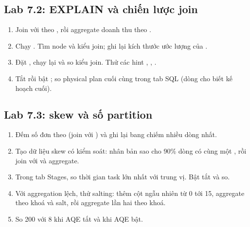 \subsection{Lab 7.2: EXPLAIN và chiến lược join}
\begin{enumerate}
  \item Join  với  theo , rồi aggregate doanh thu theo .
  \item Chạy . Tìm node  và kiểu join; ghi lại kích thước ước lượng của .
  \item Đặt , chạy lại và so kiểu join. Thử các hint , , .
  \item Tắt rồi bật ; so physical plan cuối cùng trong tab SQL (dòng  cho biết kế hoạch cuối).
\end{enumerate}

\subsection{Lab 7.3: skew và số partition}
\begin{enumerate}
  \item Đếm số đơn theo  (join  với ) và ghi lại bang chiếm nhiều dòng nhất.
  \item Tạo dữ liệu skew có kiểm soát: nhân bản  sao cho 90\% dòng có cùng một , rồi join với  và aggregate.
  \item Trong tab Stages, so thời gian task lớn nhất với trung vị. Bật tắt  và so.
  \item Với aggregation lệch, thử salting: thêm cột  ngẫu nhiên từ 0 tới 15, aggregate theo khoá và salt, rồi aggregate lần hai theo khoá.
  \item So  200 với 8 khi AQE tắt và khi AQE bật.
\end{enumerate}

